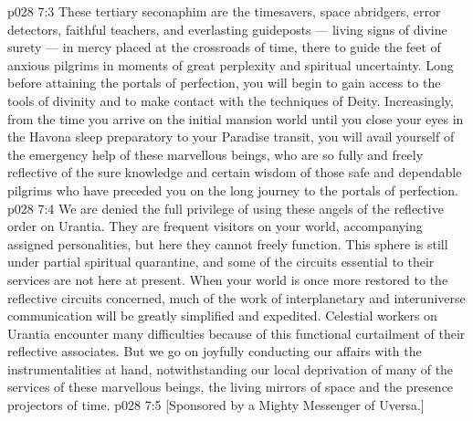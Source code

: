 \vs p028 7:3 These tertiary seconaphim are the timesavers, space abridgers, error detectors, faithful teachers, and everlasting guideposts --- living signs of divine surety --- in mercy placed at the crossroads of time, there to guide the feet of anxious pilgrims in moments of great perplexity and spiritual uncertainty. Long before attaining the portals of perfection, you will begin to gain access to the tools of divinity and to make contact with the techniques of Deity. Increasingly, from the time you arrive on the initial mansion world until you close your eyes in the Havona sleep preparatory to your Paradise transit, you will avail yourself of the emergency help of these marvellous beings, who are so fully and freely reflective of the sure knowledge and certain wisdom of those safe and dependable pilgrims who have preceded you on the long journey to the portals of perfection.
\vs p028 7:4 We are denied the full privilege of using these angels of the reflective order on Urantia. They are frequent visitors on your world, accompanying assigned personalities, but here they cannot freely function. This sphere is still under partial spiritual quarantine, and some of the circuits essential to their services are not here at present. When your world is once more restored to the reflective circuits concerned, much of the work of interplanetary and interuniverse communication will be greatly simplified and expedited. Celestial workers on Urantia encounter many difficulties because of this functional curtailment of their reflective associates. But we go on joyfully conducting our affairs with the instrumentalities at hand, notwithstanding our local deprivation of many of the services of these marvellous beings, the living mirrors of space and the presence projectors of time.
\vsetoff
\vs p028 7:5 [Sponsored by a Mighty Messenger of Uversa.]
\quizlink
